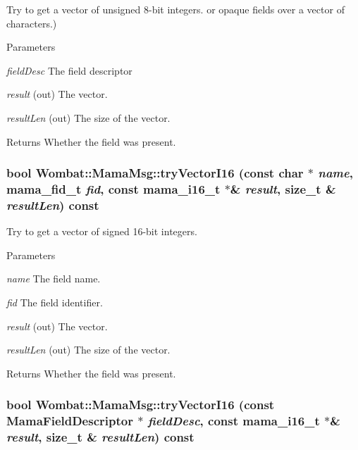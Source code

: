 Try to get a vector of unsigned 8-\/bit integers. or opaque fields over a vector of characters.) 
\begin{DoxyParams}{Parameters}
\item[{\em fieldDesc}]The field descriptor \item[{\em result}](out) The vector. \item[{\em resultLen}](out) The size of the vector. \end{DoxyParams}
\begin{DoxyReturn}{Returns}
Whether the field was present. 
\end{DoxyReturn}
\hypertarget{classWombat_1_1MamaMsg_ad8fb5bfba631224ee9eeed62250b6032}{
\subsubsection[{tryVectorI16}]{\setlength{\rightskip}{0pt plus 5cm}bool Wombat::MamaMsg::tryVectorI16 (const char $\ast$ {\em name}, \/  mama\_\-fid\_\-t {\em fid}, \/  const mama\_\-i16\_\-t $\ast$\& {\em result}, \/  size\_\-t \& {\em resultLen}) const}}
\label{classWombat_1_1MamaMsg_ad8fb5bfba631224ee9eeed62250b6032}


Try to get a vector of signed 16-\/bit integers. 
\begin{DoxyParams}{Parameters}
\item[{\em name}]The field name. \item[{\em fid}]The field identifier. \item[{\em result}](out) The vector. \item[{\em resultLen}](out) The size of the vector. \end{DoxyParams}
\begin{DoxyReturn}{Returns}
Whether the field was present. 
\end{DoxyReturn}
\hypertarget{classWombat_1_1MamaMsg_a974f0d598b661287e29282a1c21ee804}{
\subsubsection[{tryVectorI16}]{\setlength{\rightskip}{0pt plus 5cm}bool Wombat::MamaMsg::tryVectorI16 (const {\bf MamaFieldDescriptor} $\ast$ {\em fieldDesc}, \/  const mama\_\-i16\_\-t $\ast$\& {\em result}, \/  size\_\-t \& {\em resultLen}) const}}
\label{classWombat_1_1MamaMsg_a974f0d598b661287e29282a1c21ee804}


